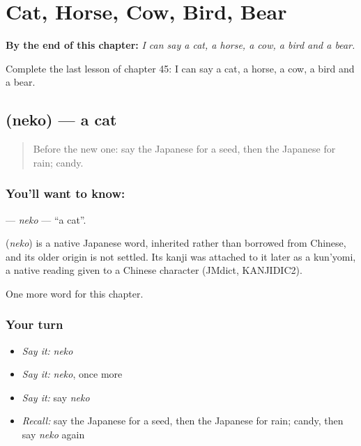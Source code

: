 
\chapter{Cat, Horse, Cow, Bird, Bear}
\label{ch:ja-cat-horse-cow-bird-bear}

\begin{chapteropening}
\textbf{By the end of this chapter:} \emph{I can say a cat, a horse, a cow, a bird and a bear.}

Complete the last lesson of chapter 45: I can say a cat, a horse, a cow, a bird and a bear.
\end{chapteropening}

\section[\texorpdfstring{\ja{ねこ} (neko)}{ねこ (neko)}]{ (neko) — a cat}

\label{lesson:JA-C45-neko}



\begin{quote}
Before the new one: say the Japanese for a seed, then the Japanese for rain; candy.
\end{quote}

\subsection*{You'll want to know: }
\textbf{} — \emph{neko} — \textquotedblleft{}a cat\textquotedblright{}.

\begin{cousinweb}
\textbf{} (\emph{neko}) is a native Japanese word, inherited rather than borrowed from Chinese, and its older origin is not settled. Its kanji was attached to it later as a kun'yomi, a native reading given to a Chinese character (JMdict, KANJIDIC2).
\end{cousinweb}

\begin{grammarlens}[title={What you've built}]
One more word for this chapter.
\end{grammarlens}

\subsection*{Your turn}
\begin{itemize}
\raggedright
  \item \emph{Say it:} \emph{neko}
  \item \emph{Say it:} \emph{neko}, once more
  \item \emph{Say it:} say \emph{neko}
  \item \emph{Recall:} say the Japanese for a seed, then the Japanese for rain; candy, then say \emph{neko} again
\end{itemize}

